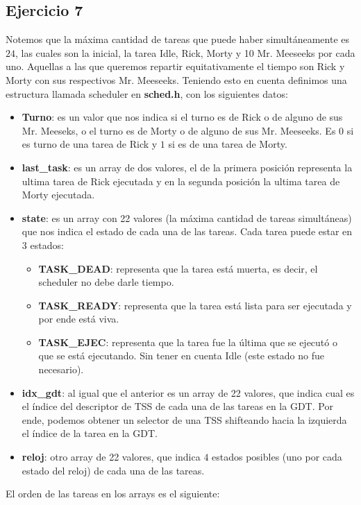 \documentclass[a4paper]{article}
\begin{document}
\subsection{Ejercicio 7}
\justify
Notemos que la máxima cantidad de tareas que puede haber simultáneamente es $24$, las cuales son la inicial, la tarea Idle, Rick, Morty y 10 Mr. Meeseeks por cada uno. Aquellas a las que queremos repartir equitativamente el tiempo son Rick y Morty con sus respectivos Mr. Meeseeks. Teniendo esto en cuenta definimos una estructura llamada scheduler en \textbf{sched.h}, con los siguientes datos:
\begin{itemize}
	\item \textbf{Turno}: es un valor que nos indica si el turno es de Rick o de alguno de sus Mr. Meeseks, o el turno es de Morty o de alguno de sus Mr. Meeseeks. Es $0$ si es turno de una tarea de Rick y $1$ si es de una tarea de Morty.
	\item \textbf{last_task}: es un array de dos valores, el de la primera posición representa la ultima tarea de Rick ejecutada y en la segunda posición la ultima tarea de Morty ejecutada.
	\item \textbf{state}: es un array con 22 valores (la máxima cantidad de tareas simultáneas) que nos indica el estado de cada una de las tareas. Cada tarea puede estar en $3$ estados:
	\begin{itemize}
		\item \textbf{TASK_DEAD}: representa que la tarea está muerta, es decir, el scheduler no debe darle tiempo.
		\item \textbf{TASK_READY}: representa que la tarea está lista para ser ejecutada y por ende está viva.
		\item \textbf{TASK_EJEC}: representa que la tarea fue la última que se ejecutó o que se está ejecutando. Sin tener en cuenta Idle (este estado no fue necesario).
	\end{itemize} 
	\item \textbf{idx_gdt}: al igual que el anterior es un array de 22 valores, que indica cual es el índice del descriptor de TSS de cada una de las tareas en la GDT. Por ende, podemos obtener un selector de una TSS shifteando hacia la izquierda el índice de la tarea en la GDT.
	\item \textbf{reloj}: otro array de 22 valores, que indica $4$ estados posibles (uno por cada estado del reloj) de cada una de las tareas.   
\end{itemize}
El orden de las tareas en los arrays es el siguiente:
\end{document}
